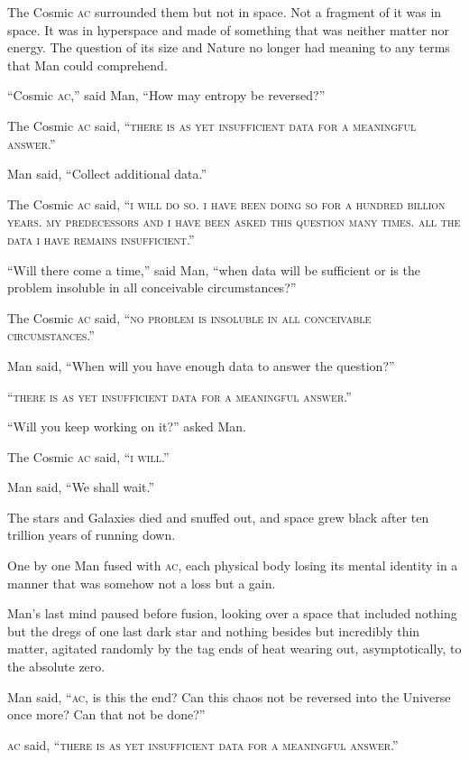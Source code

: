 The Cosmic \textsc{ac} surrounded them but not in space. Not a fragment of it was in space. It was in hyperspace and made of something that was neither matter nor energy. The question of its size and Nature no longer had meaning to any terms that Man could comprehend.

\enquote{Cosmic \textsc{ac},} said Man, \enquote{How may entropy be reversed?}

The Cosmic \textsc{ac} said, \enquote{\textsc{there is as yet insufficient data for a meaningful answer}.}

Man said, \enquote{Collect additional data.}

The Cosmic \textsc{ac} said, \enquote{\textsc{i will do so. i have been doing so for a hundred billion years. my predecessors and i have been asked this question many times. all the data i have remains insufficient}.}

\enquote{Will there come a time,} said Man, \enquote{when data will be sufficient or is the problem insoluble in all conceivable circumstances?}

The Cosmic \textsc{ac} said, \enquote{\textsc{no problem is insoluble in all conceivable circumstances}.}

Man said, \enquote{When will you have enough data to answer the question?}

\enquote{\textsc{there is as yet insufficient data for a meaningful answer}.}

\enquote{Will you keep working on it?} asked Man.

The Cosmic \textsc{ac} said, \enquote{\textsc{i will}.}

Man said, \enquote{We shall wait.}

The stars and Galaxies died and snuffed out, and space grew black after ten trillion years of running down.

One by one Man fused with \textsc{ac}, each physical body losing its mental identity in a manner that was somehow not a loss but a gain.

Man's last mind paused before fusion, looking over a space that included nothing but the dregs of one last dark star and nothing besides but incredibly thin matter, agitated randomly by the tag ends of heat wearing out, asymptotically, to the absolute zero.

Man said, \enquote{\textsc{ac}, is this the end? Can this chaos not be reversed into the Universe once more? Can that not be done?}

\textsc{ac} said, \enquote{\textsc{there is as yet insufficient data for a meaningful answer}.}

